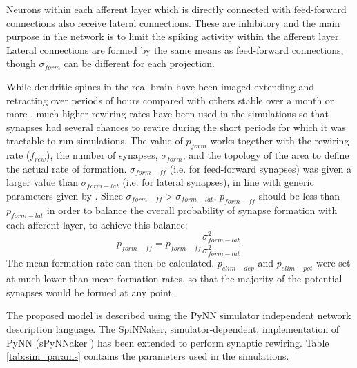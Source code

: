 \documentclass[letterpaper, 10 pt, conference]{ieeeconf}  %
\begin{document}
Neurons within each afferent layer which is directly connected with feed-forward connections also receive lateral connections. 
These are inhibitory and the main purpose in the network is to limit the spiking activity within the afferent layer. 
Lateral connections are formed by the same means as feed-forward connections, though $\sigma_{form}$ can be different for each projection.

While dendritic spines in the real brain have been imaged extending and retracting over periods of hours compared with others stable over a month or more \cite{Grutzendler2002}, 
much higher rewiring rates have been used in the simulations so that synapses had several chances to rewire during the short periods for which it was tractable to run simulations.
The value of $p_{form}$ works together with the rewiring rate ($f_{rew}$), the number of synapses, $\sigma_{form}$, and the topology of the area to define the actual rate of formation.
$\sigma_{form-ff}$ (i.e. for feed-forward synapses) was given a larger value than $\sigma_{form-lat}$ (i.e. for lateral synapses), in line with generic parameters given by \cite{miikkulainen2006computational}.
Since $\sigma_{form-ff} > \sigma_{form-lat}$, $p_{form-ff}$ should be less than $p_{form-lat}$ in order to balance the overall probability of synapse formation with each afferent layer, to achieve this balance:
\begin{equation}
    p_{form-ff} = p_{form-ff} \frac{\sigma^2_{form-lat}}{\sigma^2_{form-lat}}.
\end{equation}
The mean formation rate can then be calculated. 
$p_{elim-dep}$ and $p_{elim-pot}$ were set at much lower than mean formation rates, so that the majority of the potential synapses would be formed at any point.

The proposed model is described using the PyNN \cite{davison2009pynn} simulator independent network description language. 
The SpiNNaker, simulator-dependent, implementation of PyNN (sPyNNaker \cite{rhodes2018spynnaker}) has been extended to perform synaptic rewiring. 
Table \ref{tab:sim_params} contains the parameters used in the simulations.
\end{document}

